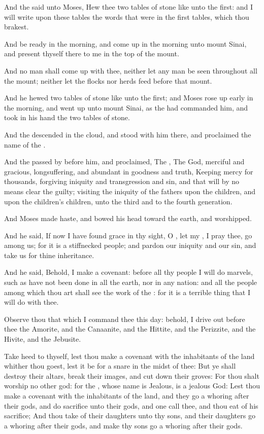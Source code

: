 \Chapter
\Verse And the \LORD said unto Moses, Hew thee two tables of stone like unto the first: and I will write upon these tables the words that were in the first tables, which thou brakest.

\Verse And be ready in the morning, and come up in the morning unto mount Sinai, and present thyself there to me in the top of the mount.

\Verse And no man shall come up with thee, neither let any man be seen throughout all the mount; neither let the flocks nor herds feed before that mount.

\Verse And he hewed two tables of stone like unto the first; and Moses rose up early in the morning, and went up unto mount Sinai, as the \LORD had commanded him, and took in his hand the two tables of stone.

\Verse And the \LORD descended in the cloud, and stood with him there, and proclaimed the name of the \LORD.

\Verse And the \LORD passed by before him, and proclaimed, The \LORD, The \LORD God, merciful and gracious, longsuffering, and abundant in goodness and truth, \Verse Keeping mercy for thousands, forgiving iniquity and transgression and sin, and that will by no means clear the guilty; visiting the iniquity of the fathers upon the children, and upon the children's children, unto the third and to the fourth generation.

\Verse And Moses made haste, and bowed his head toward the earth, and worshipped.

\Verse And he said, If now I have found grace in thy sight, O \LORD, let my \LORD, I pray thee, go among us; for it is a stiffnecked people; and pardon our iniquity and our sin, and take us for thine inheritance.

\Verse And he said, Behold, I make a covenant: before all thy people I will do marvels, such as have not been done in all the earth, nor in any nation: and all the people among which thou art shall see the work of the \LORD: for it is a terrible thing that I will do with thee.

\Verse Observe thou that which I command thee this day: behold, I drive out before thee the Amorite, and the Canaanite, and the Hittite, and the Perizzite, and the Hivite, and the Jebusite.

\Verse Take heed to thyself, lest thou make a covenant with the inhabitants of the land whither thou goest, lest it be for a snare in the midst of thee: \Verse But ye shall destroy their altars, break their images, and cut down their groves: \Verse For thou shalt worship no other god: for the \LORD, whose name is Jealous, is a jealous God: \Verse Lest thou make a covenant with the inhabitants of the land, and they go a whoring after their gods, and do sacrifice unto their gods, and one call thee, and thou eat of his sacrifice; \Verse And thou take of their daughters unto thy sons, and their daughters go a whoring after their gods, and make thy sons go a whoring after their gods.

